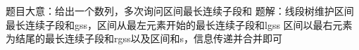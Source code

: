 题目大意：给出一个数列，多次询问区间最长连续子段和
题解：线段树维护区间最长连续子段和gss，区间从最左元素开始的最长连续子段和lgss
区间以最右元素为结尾的最长连续子段和rgss以及区间和s，信息传递并合并即可